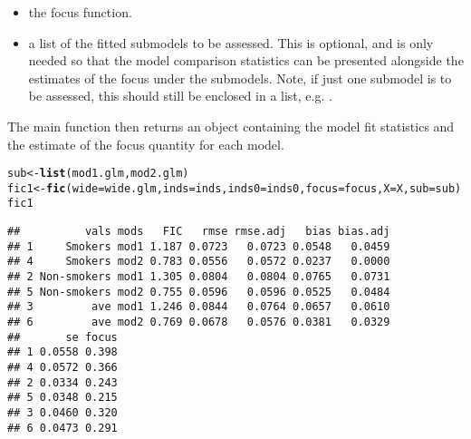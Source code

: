 \documentclass[article,shortnames,nojss,nofooter]{jss}\usepackage[]{graphicx}\usepackage[]{color}
\makeatletter
\newcommand{\hlstd}[1]{\textcolor[rgb]{0.345,0.345,0.345}{#1}}%
\newcommand{\hlkwb}[1]{\textcolor[rgb]{0.69,0.353,0.396}{#1}}%
\newcommand{\hlkwc}[1]{\textcolor[rgb]{0.333,0.667,0.333}{#1}}%
\newcommand{\hlkwd}[1]{\textcolor[rgb]{0.737,0.353,0.396}{\textbf{#1}}}%
\newenvironment{kframe}{%
 \def\at@end@of@kframe{}%
 \ifinner\ifhmode%
  \def\at@end@of@kframe{\end{minipage}}%
  \begin{minipage}{\columnwidth}%
 \fi\fi%
 \def\FrameCommand##1{\hskip\@totalleftmargin \hskip-\fboxsep
 \colorbox{shadecolor}{##1}\hskip-\fboxsep
     \hskip-\linewidth \hskip-\@totalleftmargin \hskip\columnwidth}%
 \MakeFramed {\advance\hsize-\width
   \@totalleftmargin\z@ \linewidth\hsize
   \@setminipage}}%
 {\par\unskip\endMakeFramed%
 \at@end@of@kframe}
\newenvironment{knitrout}{}{} %
\makeatother
\begin{document}
\begin{itemize}
\item {} the focus function. 

\item {} a list of the fitted submodels to be assessed.  This is optional, and is only needed so that the model comparison statistics can be presented alongside the estimates of the focus under the submodels.  Note, if just one submodel is to be assessed, this should still be enclosed in a list, e.g. . 

\end{itemize}

The main  function then returns an object containing the model fit statistics and the estimate of the focus quantity for each model. 

\begin{knitrout}
\color{fgcolor}\begin{kframe}
\begin{alltt}
\hlstd{sub} \hlkwb{<-} \hlkwd{list}\hlstd{(mod1.glm, mod2.glm)}
\hlstd{fic1} \hlkwb{<-} \hlkwd{fic}\hlstd{(}\hlkwc{wide}\hlstd{=wide.glm,} \hlkwc{inds}\hlstd{=inds,} \hlkwc{inds0}\hlstd{=inds0,} \hlkwc{focus}\hlstd{=focus,} \hlkwc{X}\hlstd{=X,} \hlkwc{sub}\hlstd{=sub)}
\hlstd{fic1}
\end{alltt}
\begin{verbatim}
##          vals mods   FIC   rmse rmse.adj   bias bias.adj
## 1     Smokers mod1 1.187 0.0723   0.0723 0.0548   0.0459
## 4     Smokers mod2 0.783 0.0556   0.0572 0.0237   0.0000
## 2 Non-smokers mod1 1.305 0.0804   0.0804 0.0765   0.0731
## 5 Non-smokers mod2 0.755 0.0596   0.0596 0.0525   0.0484
## 3         ave mod1 1.246 0.0844   0.0764 0.0657   0.0610
## 6         ave mod2 0.769 0.0678   0.0576 0.0381   0.0329
##       se focus
## 1 0.0558 0.398
## 4 0.0572 0.366
## 2 0.0334 0.243
## 5 0.0348 0.215
## 3 0.0460 0.320
## 6 0.0473 0.291
\end{verbatim}
\end{kframe}
\end{knitrout}
\end{document}
